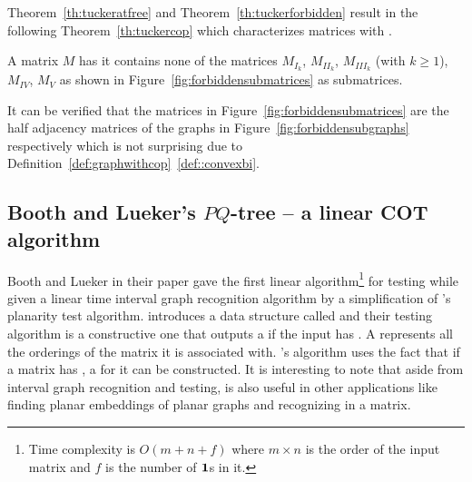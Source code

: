 \figforbiddensubgraphs


Theorem~\ref{th:tuckeratfree} and Theorem~\ref{th:tuckerforbidden}
result in the following Theorem~\ref{th:tuckercop} which characterizes
matrices with \COP.

\begin{theoremsansproof}
  A matrix $M$ has \COP \iff it contains none of the matrices 
$M_{I_k}$, $M_{II_k}$, $M_{III_k}$ (with $k \ge 1$), $M_{IV}$,
  $M_{V}$ as shown in Figure~\ref{fig:forbiddensubmatrices} as submatrices.
  \label{th:tuckercop}
\end{theoremsansproof}

\figforbiddensubmatrices

It can be verified that the matrices in
Figure~\ref{fig:forbiddensubmatrices} are the half adjacency matrices
of the graphs in Figure~\ref{fig:forbiddensubgraphs} respectively
which is not surprising due to
Definition~\ref{def:graphwithcop}~\ref{def::convexbi}.

\subsection{Booth and Lueker's $PQ$-tree -- a linear COT algorithm} %

Booth and Lueker in their paper \cite{bl76} gave the first linear
algorithm\footnote{Time complexity is $O\left(m+n+f\right)$ where $m
  \times n$ is the order of the input matrix and $f$ is the number of
  $\textbf{1}$s in it.} for \cop testing while given a linear time interval
graph recognition algorithm by a simplification of 's planarity test algorithm.
%
\cite{bl76} introduces a data structure called \PQtree and their \COP
testing algorithm is a constructive one that outputs a \PQtree if the
input has \COP. A \PQtree represents all the \COP orderings of the
matrix it is associated with. \cite{bl76}'s algorithm uses the fact
that if a matrix has \COP, a \PQtree for it can be constructed. It is
interesting to note that aside from interval graph recognition and
\COP testing, \PQtree is also useful in other applications like
finding planar embeddings of planar graphs \cite{lec67,mcc04} and
recognizing \CROP in a matrix.

